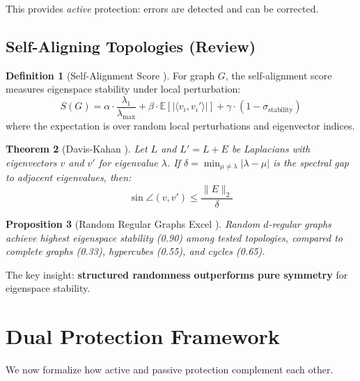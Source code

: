 \documentclass[11pt,a4paper]{article}
\newtheorem{theorem}{Theorem}[section]
\newtheorem{proposition}[theorem]{Proposition}
\theoremstyle{definition}
\newtheorem{definition}[theorem]{Definition}
\newcommand{\E}{\mathbb{E}}
\begin{document}
This provides \emph{active} protection: errors are detected and can be corrected.

\subsection{Self-Aligning Topologies (Review)}

\begin{definition}[Self-Alignment Score \cite{benshalom2026selfaligning}]
For graph $G$, the self-alignment score measures eigenspace stability under local perturbation:
\begin{equation}
    S(G) = \alpha \cdot \frac{\lambda_1}{\lambda_{\max}} + \beta \cdot \E[|\langle v_i, v_i'\rangle|] + \gamma \cdot (1 - \sigma_{\text{stability}})
\end{equation}
where the expectation is over random local perturbations and eigenvector indices.
\end{definition}

\begin{theorem}[Davis-Kahan \cite{davis1970rotation}]
\label{thm:davis_kahan}
Let $L$ and $L' = L + E$ be Laplacians with eigenvectors $v$ and $v'$ for eigenvalue $\lambda$. If $\delta = \min_{\mu \neq \lambda}|\lambda - \mu|$ is the spectral gap to adjacent eigenvalues, then:
\begin{equation}
    \sin \angle(v, v') \leq \frac{\|E\|_2}{\delta}
\end{equation}
\end{theorem}

\begin{proposition}[Random Regular Graphs Excel \cite{benshalom2026selfaligning}]
\label{prop:rrg_excel}
Random $d$-regular graphs achieve highest eigenspace stability (0.90) among tested topologies, compared to complete graphs (0.33), hypercubes (0.55), and cycles (0.65).
\end{proposition}

The key insight: \textbf{structured randomness outperforms pure symmetry} for eigenspace stability.

\section{Dual Protection Framework}
\label{sec:dual}

We now formalize how active and passive protection complement each other.
\end{document}
